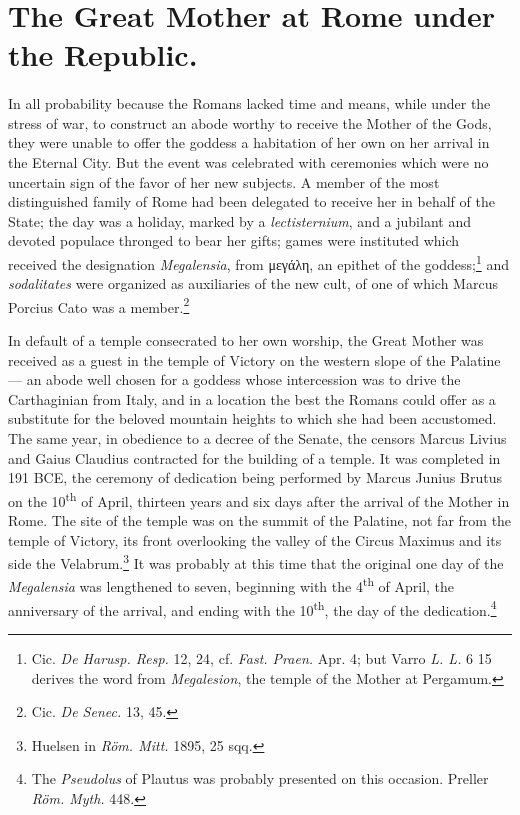 \documentclass[a4paper, 11pt, oneside, polutonikogreek, english]{article}
\begin{document}
\section{The Great Mother at Rome under the Republic.}
\paragraph{}
In all probability because the Romans lacked time and means, while under the stress of war, to construct an abode worthy to receive the Mother of the Gods, they were unable to offer the goddess a habitation of her own on her arrival in the Eternal City. But the event was celebrated with ceremonies which were no uncertain sign of the favor of her new subjects. A member of the most distinguished family of Rome had been delegated to receive her in behalf of the State; the day was a holiday, marked by a \emph{lectisternium}, and a jubilant and devoted populace thronged to bear her gifts; games were instituted which received the designation \emph{Megalensia}, from μεγάλη, an epithet of the goddess;\footnote{Cic. \emph{De Harusp. Resp.} 12, 24, cf. \emph{Fast. Praen.} Apr. 4; but Varro \emph{L. L.} 6 15 derives the word from \emph{Megalesion}, the temple of the Mother at Pergamum.} and \emph{sodalitates} were organized as auxiliaries of the new cult, of one of which Marcus Porcius Cato was a member.\footnote{Cic. \emph{De Senec.} 13, 45.}

In default of a temple consecrated to her own worship, the Great Mother was received as a guest in the temple of Victory on the western slope of the Palatine --- an abode well chosen for a goddess whose intercession was to drive the Carthaginian from Italy, and in a location the best the Romans could offer as a substitute for the beloved mountain heights to which she had been accustomed. The same year, in obedience to a decree of the Senate, the censors Marcus Livius and Gaius Claudius contracted for the building of a temple. It was completed in 191 \textsc{BCE}, the ceremony of dedication being performed by Marcus Junius Brutus on the 10\textsuperscript{th} of April, thirteen years and six days after the arrival of the Mother in Rome. The site of the temple was on the summit of the Palatine, not far from the temple of Victory, its front overlooking the valley of the Circus Maximus and its side the Velabrum.\footnote{Huelsen in \emph{Röm. Mitt.} 1895, 25 sqq.} It was probably at this time that the original one day of the \emph{Megalensia} was lengthened to seven, beginning with the 4\textsuperscript{th} of April, the anniversary of the arrival, and ending with the 10\textsuperscript{th}, the day of the dedication.\footnote{The \emph{Pseudolus} of Plautus was probably presented on this occasion. Preller \emph{Röm. Myth.} 448.}
\end{document}
